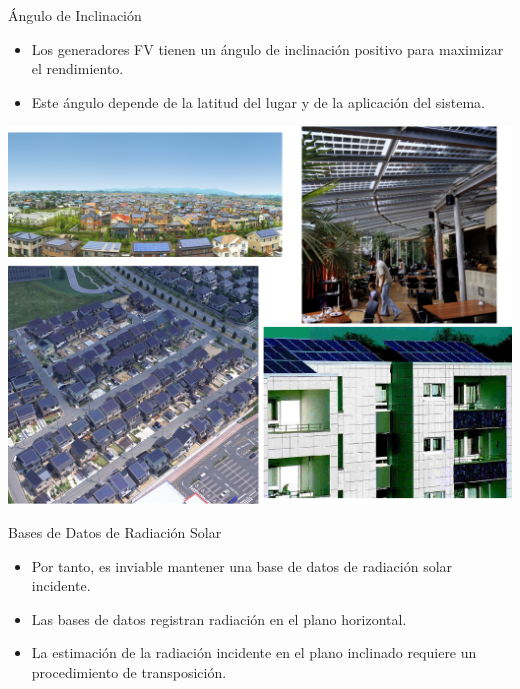 \documentclass[xcolor={usenames,svgnames,dvipsnames}]{beamer}
\begin{document}
\begin{frame}[label={sec:orgba814dd}]{Ángulo de Inclinación}
\begin{itemize}
\item Los generadores FV tienen un \alert{ángulo de inclinación positivo} para maximizar el rendimiento.
\item Este ángulo depende de la \alert{latitud} del lugar y de la \alert{aplicación del sistema}.
\end{itemize}

\begin{center}
\includegraphics[height=0.5\textheight]{../figs/PVUrban.png}
\end{center}
\end{frame}

\begin{frame}[label={sec:org81005f7}]{Bases de Datos de Radiación Solar}
\begin{itemize}
\item Por tanto, es inviable mantener una base de datos de radiación solar \alert{incidente}.
\item Las \alert{bases de datos} registran radiación en el \alert{plano horizontal}.
\item La estimación de la radiación incidente en el plano inclinado requiere un \alert{procedimiento de transposición}.
\end{itemize}
\end{frame}
\end{document}
